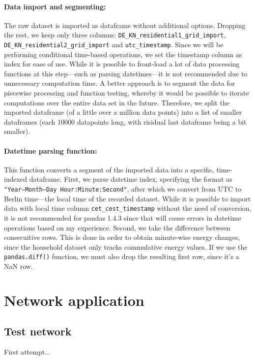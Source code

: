\documentclass[a4paper,10pt]{report}
\begin{document}
\paragraph{Data import and segmenting:} The raw dataset is imported as dataframe without additional options. Dropping the rest, we keep only three columns: \texttt{DE\_KN\_residential1\_grid\_import}, \texttt{DE\_KN\_residential2\_grid\_import} and \texttt{utc\_timestamp}. Since we will be performing conditional time-based operations, we set the timestamp column as index for ease of use. While it is possible to front-load a lot of data processing functions at this step---such as parsing datetimes---it is not recommended due to unnecessary computation time. A better approach is to segment the data for piecewise processing and function testing, whereby it would be possible to iterate computations over the entire data set in the future. Therefore, we split the imported dataframe (of a little over a million data points) into a list of smaller dataframes (each 10000 datapoints long, with risidual last dataframe being a bit smaller).

\paragraph{Datetime parsing function:} This function converts a segment of the imported data into a specific, time-indexed dataframe. First, we parse datetime index, specifying the format as \texttt{"Year--Month--Day Hour:Minute:Second"}, after which we convert from UTC to Berlin time---the local time of the recorded dataset. While it is possible to import data with local time column \texttt{cet\_cest\_timestamp} without the need of conversion, it is not recommended for pandas 1.4.3 since that will cause errors in datetime operations based on my experience. Second, we take the difference between consecuitive rows. This is done in order to obtain minute-wise energy changes, since the household dataset only tracks commulative energy values. If we use the \texttt{pandas.diff()} function, we must also drop the resulting first row, since it's a NaN row.

\section{Network application}
\subsection{Test network}
First attempt...
\end{document}
